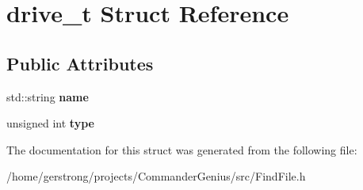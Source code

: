 \hypertarget{structdrive__t}{
\section{drive\_\-t Struct Reference}
\label{structdrive__t}
}
\subsection*{Public Attributes}
\begin{DoxyCompactItemize}
\item 
\hypertarget{structdrive__t_a52e90800927baeaef30a088224ad5507}{
std::string {\bfseries name}}
\label{structdrive__t_a52e90800927baeaef30a088224ad5507}

\item 
\hypertarget{structdrive__t_a750780a7e2b60f1dc87dd9b25abaf007}{
unsigned int {\bfseries type}}
\label{structdrive__t_a750780a7e2b60f1dc87dd9b25abaf007}

\end{DoxyCompactItemize}


The documentation for this struct was generated from the following file:\begin{DoxyCompactItemize}
\item 
/home/gerstrong/projects/CommanderGenius/src/FindFile.h\end{DoxyCompactItemize}
